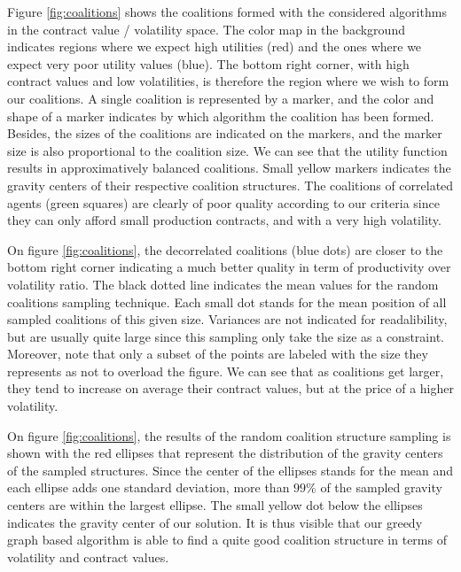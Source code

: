 \documentclass[conference]{IEEEtran}
\begin{document}
Figure \ref{fig:coalitions} shows the coalitions formed with the considered algorithms in the contract value / volatility space. The color map in the background indicates regions where we expect high utilities (red) and the ones where we expect very poor utility values (blue). The bottom right corner, with high contract values and low volatilities, is therefore the region where we wish to form our coalitions. A single coalition is represented by a marker, and the color and shape of a marker indicates by which algorithm the coalition has been formed. Besides, the sizes of the coalitions are indicated on the markers, and the marker size is also proportional to the coalition size. We can see that the utility function results in approximatively balanced coalitions. Small yellow markers indicates the gravity centers of their respective coalition structures. The coalitions of correlated agents (green squares) are clearly of poor quality according to our criteria since they can only afford small production contracts, and with a very high volatility. 

On figure \ref{fig:coalitions}, the decorrelated coalitions (blue dots) are closer to the bottom right corner indicating a much better quality in term of productivity over volatility ratio. The black dotted line indicates the mean values for the random coalitions sampling technique. Each small dot stands for the mean position of all sampled coalitions of this given size. Variances are not indicated for readalibility, but are usually quite large since this sampling only take the size as a constraint. Moreover, note that only a subset of the points are labeled with the size they represents as not to overload the figure. We can see that as coalitions get larger, they tend to increase on average their contract values, but at the price of a higher volatility. 

On figure \ref{fig:coalitions}, the results of the random coalition structure sampling is shown with the red ellipses that represent the distribution of the gravity centers of the sampled structures. Since the center of the ellipses stands for the mean and each ellipse adds one standard deviation, more than $ 99\% $ of the sampled gravity centers are within the largest ellipse. The small yellow dot below the ellipses indicates the gravity center of our solution. It is thus visible that our greedy graph based algorithm is able to find a quite good coalition structure in terms of volatility and contract values.
\end{document}
